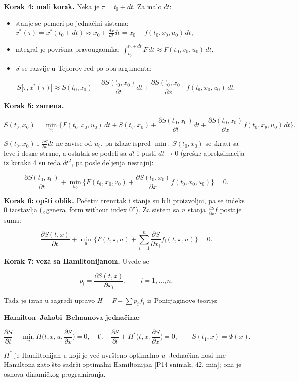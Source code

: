 \documentclass[11pt,a4paper,parskip=half,headsepline,numbers=noenddot]{scrartcl}
\DeclareRobustCommand{\izvor}[1]{{\small\color{izvorC}[#1]}}
\begin{document}
\textbf{Korak 4: mali korak.} Neka je \(\tau = t_0 + dt\). Za malo \(dt\):

\begin{itemize}
\item stanje se pomeri po jednačini sistema: \(x^*(\tau) = x^*(t_0 + dt) \approx x_0 + \frac{dx}{dt}dt = x_0 + f(t_0, x_0, u_0)\,dt\),
\item integral je površina pravougaonika: \(\int_{t_0}^{t_0 + dt}F\,dt \approx F(t_0, x_0, u_0)\,dt\),
\item \(S\) se razvije u Tejlorov red po oba argumenta:
\end{itemize}

\[S\big[\tau, x^*(\tau)\big] \approx S(t_0, x_0) + \frac{\partial S(t_0, x_0)}{\partial t}dt + \frac{\partial S(t_0, x_0)}{\partial x}f(t_0, x_0, u_0)\,dt .\]

\textbf{Korak 5: zamena.}

\[S(t_0, x_0) = \min_{u_0}\Big\{F(t_0, x_0, u_0)\,dt + S(t_0, x_0) + \frac{\partial S(t_0, x_0)}{\partial t}dt + \frac{\partial S(t_0, x_0)}{\partial x}f(t_0, x_0, u_0)\,dt\Big\} .\]

\(S(t_0, x_0)\) i \(\frac{\partial S}{\partial t}dt\) ne zavise od \(u_0\), pa izlaze ispred \(\min\). \(S(t_0, x_0)\) se skrati sa leve i desne strane, a ostatak se podeli sa \(dt\) i pusti \(dt \to 0\) (greške aproksimacija iz koraka 4 su reda \(dt^2\), pa posle deljenja nestaju):

\[\frac{\partial S(t_0, x_0)}{\partial t} + \min_{u_0}\Big\{F(t_0, x_0, u_0) + \frac{\partial S(t_0, x_0)}{\partial x}f(t_0, x_0, u_0)\Big\} = 0 .\]

\textbf{Korak 6: opšti oblik.} Početni trenutak i stanje su bili proizvoljni, pa se indeks 0 izostavlja („general form without index 0''). Za sistem sa \(n\) stanja \(\frac{\partial S}{\partial x}f\) postaje suma:

\[\frac{\partial S(t, x)}{\partial t} + \min_u\Big\{F(t, x, u) + \sum_{i=1}^n\frac{\partial S}{\partial x_i}f_i(t, x, u)\Big\} = 0 .\]

\textbf{Korak 7: veza sa Hamiltonijanom.} Uvede se

\[p_i = \frac{\partial S(t, x)}{\partial x_i}, \qquad i = 1, \dots, n .\]

Tada je izraz u zagradi upravo \(H = F + \sum p_if_i\) iz Pontrjaginove teorije:

\begin{kljucna}
\textbf{Hamilton--Jakobi--Belmanova jednačina:}

\[\frac{\partial S}{\partial t} + \min_u H\Big(t, x, u, \frac{\partial S}{\partial x}\Big) = 0, \quad\text{tj.}\quad \frac{\partial S}{\partial t} + H^*\Big(t, x, \frac{\partial S}{\partial x}\Big) = 0, \qquad S(t_1, x) = \Psi(x) .\]

\(H^*\) je Hamiltonijan u koji je već uvršteno optimalno \(u\). Jednačina nosi ime Hamiltona zato što sadrži optimalni Hamiltonijan \izvor{P14 snimak, 42. min}; ona je osnova dinamičkog programiranja.
\end{kljucna}
\end{document}
